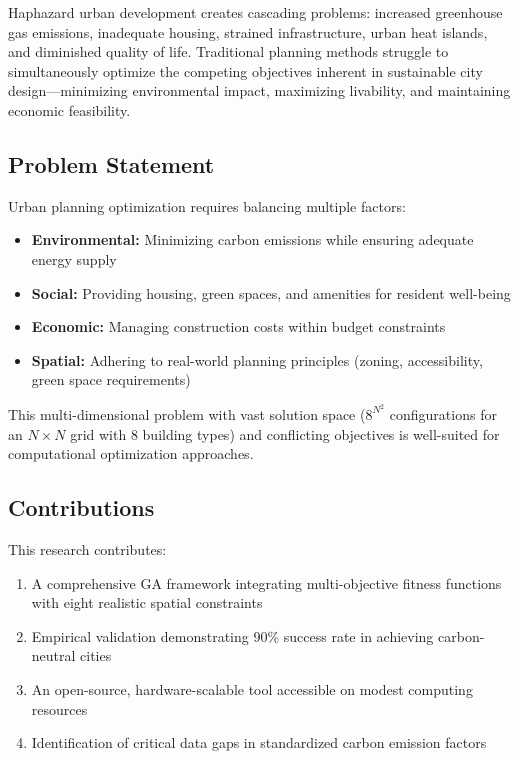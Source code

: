 \documentclass[conference]{IEEEtran}
\begin{document}
Haphazard urban development creates cascading problems: increased greenhouse gas emissions, inadequate housing, strained infrastructure, urban heat islands, and diminished quality of life. Traditional planning methods struggle to simultaneously optimize the competing objectives inherent in sustainable city design—minimizing environmental impact, maximizing livability, and maintaining economic feasibility.

\subsection{Problem Statement}

Urban planning optimization requires balancing multiple factors:
\begin{itemize}
    \item \textbf{Environmental:} Minimizing carbon emissions while ensuring adequate energy supply
    \item \textbf{Social:} Providing housing, green spaces, and amenities for resident well-being
    \item \textbf{Economic:} Managing construction costs within budget constraints
    \item \textbf{Spatial:} Adhering to real-world planning principles (zoning, accessibility, green space requirements)
\end{itemize}

This multi-dimensional problem with vast solution space ($8^{N^2}$ configurations for an $N \times N$ grid with 8 building types) and conflicting objectives is well-suited for computational optimization approaches.

\subsection{Contributions}

This research contributes:
\begin{enumerate}
    \item A comprehensive GA framework integrating multi-objective fitness functions with eight realistic spatial constraints
    \item Empirical validation demonstrating 90\% success rate in achieving carbon-neutral cities
    \item An open-source, hardware-scalable tool accessible on modest computing resources
    \item Identification of critical data gaps in standardized carbon emission factors
\end{enumerate}
\end{document}
